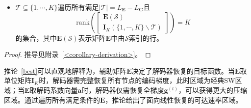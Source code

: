 \begin{corollary}
\begin{itemize}
		\item[(d)] $\mathcal{T}\subseteq\{1,\cdots,K\}$遍历所有满足$|\mathcal{T}|=L_{\mathbf{E}}-L_{\mathbf{C}}$且
		\begin{equation}
			\mathrm{rank}\left(\begin{bmatrix}
				\mathbf{E}(\mathcal{S})\\
					\mathbf{I}_{K}(\{1,\cdots,K\}\backslash\mathcal{T})
			\end{bmatrix}\right)=K
		\end{equation}
		的集合，其中$\mathbf{E}(\mathcal{S})$表示矩阵$\mathbf{E}$中由$\mathcal{S}$索引的行。
	\end{itemize}
\end{corollary}
\begin{proof}
	推导见附录~\ref{<corollary-derivation>}。
\end{proof}

%
%
 \begin{remark}
	推论~\ref{bcst}可以直观地解释为，辅助矩阵$\mathbf{E}$决定了解码器恢复的目标函数。当$\mathbf{E}$取单位矩阵$\mathbf{I}_K$时，解码器需完整恢复所有节点的编码梯度，此时区域为经典SW区域；当$\mathbf{E}$取解码系数向量$\mathbf{a}$时，解码器仅需恢复全梯度$\mathbf{g}^{(t)}$，可以获得更大的压缩区域。通过遍历所有满足条件的$\mathbf{E}$，推论给出了面向线性恢复的可达速率区域。
\end{remark}


